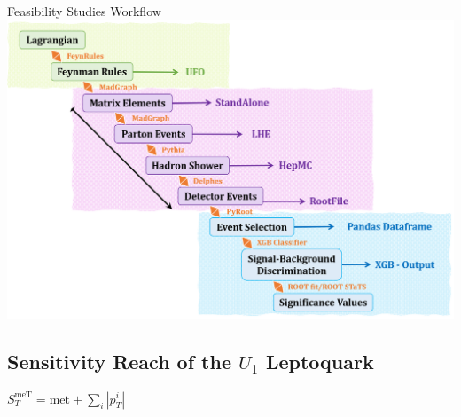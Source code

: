 \documentclass{../bredelebeamer}
\begin{document}

\begin{frame}{Feasibility Studies Workflow}
	\includegraphics[width=1.0\linewidth]{../2023_paper/Workflow.png}
\end{frame}


\subsection{Sensitivity Reach of the $U_1$ Leptoquark}

\begin{frame}{$S_T^{\text{meT}}=\text{met} + \sum_i\left|p_{T}^i\right|$}
	
	
\end{frame}
\end{document}
